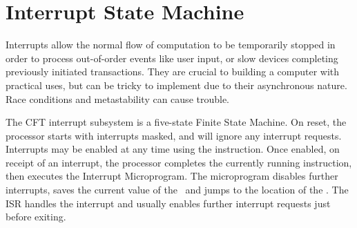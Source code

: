 



\section{Interrupt State Machine}
\label{sec:interrupts-state-machine}

Interrupts allow the normal flow of computation to be temporarily stopped in
order to process out-of-order events like user input, or slow devices
completing previously initiated transactions. They are crucial to building a
computer with practical uses, but can be tricky to implement due to their
asynchronous nature. Race conditions and metastability can cause trouble.

The CFT interrupt subsystem is a five-state Finite State Machine. On reset, the
processor starts with interrupts masked, and will ignore any interrupt
requests. Interrupts may be enabled at any time using the 
instruction. Once enabled, on receipt of an interrupt, the processor completes
the currently running instruction, then executes the Interrupt
Microprogram. The microprogram disables further interrupts, saves the current
value of the \PC~and jumps to the location of the . The ISR
handles the interrupt and usually enables further interrupt requests just
before exiting.

